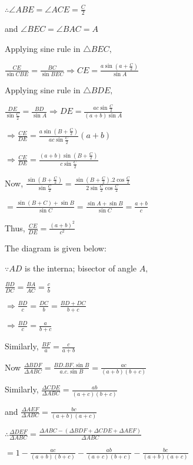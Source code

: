   $\therefore \angle ABE = \angle ACE = \frac{C}{2}$

  and $\angle BEC = \angle BAC = A$

  Applying sine rule in $\triangle BEC,$

  $\frac{CE}{\sin CBE} = \frac{BC}{\sin BEC} \Rightarrow CE = \frac{a\sin\left(a + \frac{C}{2}\right)}{\sin A}$

  Applying sine rule in $\triangle BDE,$

  $\frac{DE}{\sin\frac{C}{2}} = \frac{BD}{\sin A}\Rightarrow DE = \frac{ac\sin\frac{C}{2}}{(a + b)\sin A}$

  $\Rightarrow \frac{CE}{DE} = \frac{a\sin\left(B + \frac{C}{2}\right)}{ac\sin\frac{C}{2}}(a + b)$

  $\Rightarrow \frac{CE}{DE} = \frac{(a + b)\sin\left(B + \frac{C}{2}\right)}{c\sin \frac{C}{2}}$

  Now, $\frac{\sin\left(B + \frac{C}{2}\right)}{\sin\frac{C}{2}} = \frac{\sin\left(B +
    \frac{C}{2}\right).2\cos\frac{C}{2}}{2\sin\frac{C}{2}\cos\frac{C}{2}}$

  $= \frac{\sin(B + C)+ \sin B}{\sin C} = \frac{\sin A + \sin B}{\sin C} = \frac{a + b}{c}$

  Thus, $\frac{CE}{DE} = \frac{(a + b)^2}{c^2}$

\item The diagram is given below:

  \startplacefigure
    \externalfigure[20_1.pdf]
  \stopplacefigure

  $\because AD$ is the interna; bisector of angle $A,$

  $\frac{BD}{DC} = \frac{BA}{AC} = \frac{c}{b}$

  $\Rightarrow \frac{BD}{c} = \frac{DC}{b} = \frac{BD + DC}{b + c}$

  $\Rightarrow \frac{BD}{c} = \frac{a}{b + c}$

  Similarly, $\frac{BF}{a} = \frac{c}{a + b}$

  Now $\frac{\Delta BDF}{\Delta ABC} = \frac{BD.BF.\sin B}{a.c.\sin B} = \frac{ac}{(a + b)(b + c)}$

  Similarly, $\frac{\Delta CDE}{\Delta ABC} = \frac{ab}{(a + c)(b + c)}$

  and $\frac{\Delta AEF}{\Delta ABC} = \frac{bc}{(a + b)(a + c)}$

  $\therefore \frac{\Delta DEF}{\Delta ABC} = \frac{\Delta ABC - (\Delta BDF + \Delta CDE + \Delta AEF)}{\Delta ABC}$

  $= 1 - \frac{ac}{(a + b)(b + c)} - \frac{ab}{(a + c)(b + c)} - \frac{bc}{(a + b)(a + c)}$

